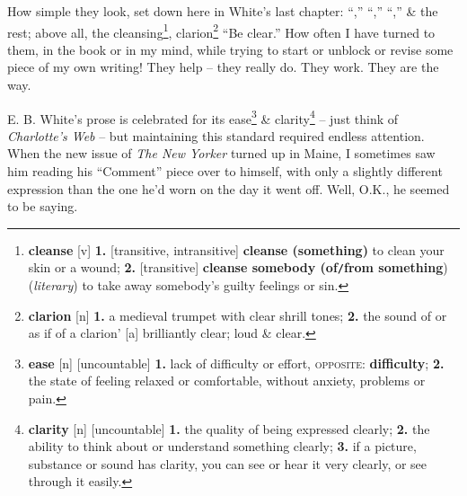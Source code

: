 \documentclass{article}
\begin{document}
How simple they look, set down here in White's last chapter: ``,'' ``,'' ``,'' \& the rest; above all, the cleansing\footnote{{\bf cleanse} [v] {\bf 1.} [transitive, intransitive] {\bf cleanse (something)} to clean your skin or a wound; {\bf 2.} [transitive] {\bf cleanse somebody (of{\tt/}from something}) ({\it literary}) to take away somebody's guilty feelings or sin.}, clarion\footnote{{\bf clarion} [n] {\bf 1.} a medieval trumpet with clear shrill tones; {\bf 2.} the sound of or as if of a clarion' [a] brilliantly clear; loud \& clear.} ``Be clear.'' How often I have turned to them, in the book or in my mind, while trying to start or unblock or revise some piece of my own writing! They help -- they really do. They work. They are the way.

E. B. White's prose is celebrated for its ease\footnote{{\bf ease} [n] [uncountable] {\bf 1.} lack of difficulty or effort, \textsc{opposite}: {\bf difficulty}; {\bf 2.} the state of feeling relaxed or comfortable, without anxiety, problems or pain.} \& clarity\footnote{{\bf clarity} [n] [uncountable] {\bf 1.} the quality of being expressed clearly; {\bf 2.} the ability to think about or understand something clearly; {\bf 3.} if a picture, substance or sound has clarity, you can see or hear it very clearly, or see through it easily.} -- just think of {\it Charlotte's Web} -- but maintaining this standard required endless attention. When the new issue of {\it The New Yorker} turned up in Maine, I sometimes saw him reading his ``Comment'' piece over to himself, with only a slightly different expression than the one he'd worn on the day it went off. Well, O.K., he seemed to be saying. 
\end{document}
